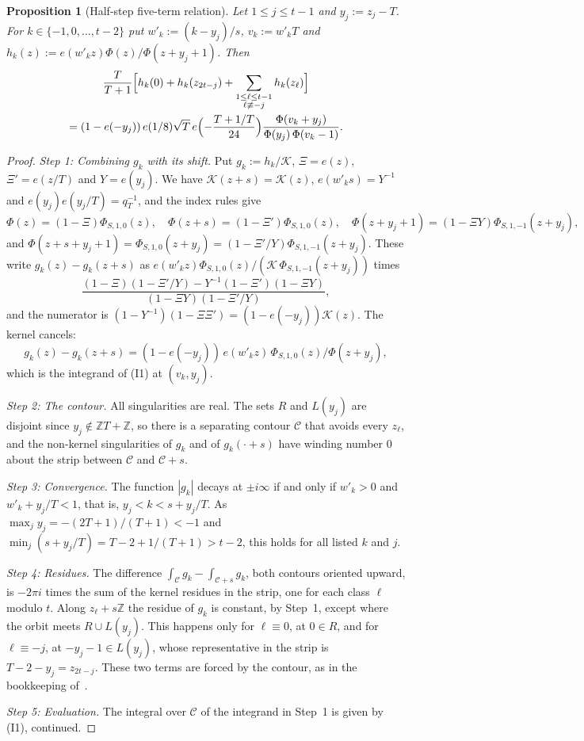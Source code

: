 \documentclass[11pt]{amsart}
\numberwithin{equation}{section}
\theoremstyle{plain}
\newtheorem{proposition}[theorem]{Proposition}
\theoremstyle{definition}
\theoremstyle{remark}
\begin{document}
\begin{proposition}[Half-step five-term relation]\label{prop:halfstep}
Let \(1\le j\le t-1\) and \(y_j:=z_j-T\). For \(k\in\{-1,0,\dots,t-2\}\) put \(w'_k:=(k-y_j)/s\), \(v_k:=w'_kT\) and \(h_k(z):=e(w'_kz)\Phi(z)/\Phi(z+y_j+1)\). Then
\begin{multline*}
\frac{T}{T+1}\Bigl[h_k(0)+h_k(z_{2t-j})+\sum_{\substack{1\le\ell\le t-1\\ \ell\not\equiv-j}}h_k(z_\ell)\Bigr]\\
=(1-e(-y_j))\,e(1/8)\sqrt T\,e\Bigl(-\frac{T+1/T}{24}\Bigr)\frac{\Phi(v_k+y_j)}{\Phi(y_j)\,\Phi(v_k-1)}.
\end{multline*}
\end{proposition}

\begin{proof}
\emph{Step 1: Combining \(g_k\) with its shift.} Put \(g_k:=h_k/\mathcal K\), \(\Xi=e(z)\), \(\Xi'=e(z/T)\) and \(Y=e(y_j)\). We have \(\mathcal K(z+s)=\mathcal K(z)\), \(e(w'_ks)=Y^{-1}\) and \(e(y_j)e(y_j/T)=q_T^{-1}\), and the index rules give
\[\Phi(z)=(1-\Xi)\Phi_{S,1,0}(z),\quad\Phi(z+s)=(1-\Xi')\Phi_{S,1,0}(z),\quad\Phi(z+y_j+1)=(1-\Xi Y)\Phi_{S,1,-1}(z+y_j),\]
and \(\Phi(z+s+y_j+1)=\Phi_{S,1,0}(z+y_j)=(1-\Xi'/Y)\Phi_{S,1,-1}(z+y_j)\). These write \(g_k(z)-g_k(z+s)\) as \(e(w'_kz)\Phi_{S,1,0}(z)/(\mathcal K\,\Phi_{S,1,-1}(z+y_j))\) times
\[\frac{(1-\Xi)(1-\Xi'/Y)-Y^{-1}(1-\Xi')(1-\Xi Y)}{(1-\Xi Y)(1-\Xi'/Y)},\]
and the numerator is \((1-Y^{-1})(1-\Xi\Xi')=(1-e(-y_j))\mathcal K(z)\). The kernel cancels:
\[g_k(z)-g_k(z+s)=(1-e(-y_j))\,e(w'_kz)\,\Phi_{S,1,0}(z)/\Phi(z+y_j),\]
which is the integrand of (I1) at \((v_k,y_j)\).

\emph{Step 2: The contour.} All singularities are real. The sets \(R\) and \(L(y_j)\) are disjoint since \(y_j\notin\mathbb ZT+\mathbb Z\), so there is a separating contour \(\mathcal C\) that avoids every \(z_\ell\), and the non-kernel singularities of \(g_k\) and of \(g_k(\cdot+s)\) have winding number \(0\) about the strip between \(\mathcal C\) and \(\mathcal C+s\).

\emph{Step 3: Convergence.} The function \(|g_k|\) decays at \(\pm i\infty\) if and only if \(w'_k>0\) and \(w'_k+y_j/T<1\), that is, \(y_j<k<s+y_j/T\). As \(\max_jy_j=-(2T+1)/(T+1)<-1\) and \(\min_j(s+y_j/T)=T-2+1/(T+1)>t-2\), this holds for all listed \(k\) and \(j\).

\emph{Step 4: Residues.} The difference \(\int_{\mathcal C}g_k-\int_{\mathcal C+s}g_k\), both contours oriented upward, is \(-2\pi i\) times the sum of the kernel residues in the strip, one for each class \(\ell\) modulo \(t\). Along \(z_\ell+s\mathbb Z\) the residue of \(g_k\) is constant, by Step~1, except where the orbit meets \(R\cup L(y_j)\). This happens only for \(\ell\equiv0\), at \(0\in R\), and for \(\ell\equiv-j\), at \(-y_j-1\in L(y_j)\), whose representative in the strip is \(T-2-y_j=z_{2t-j}\). These two terms are forced by the contour, as in the bookkeeping of~\cite{RW}.

\emph{Step 5: Evaluation.} The integral over \(\mathcal C\) of the integrand in Step~1 is given by (I1), continued.
\end{proof}
\end{document}
